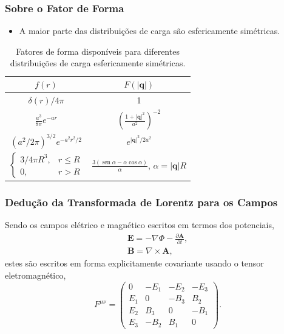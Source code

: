 \documentclass[xcolor=dvipsnames]{beamer}
\DeclareMathOperator*{\sen}{sen}
\renewcommand{\vec}{\mathbf}
\begin{document}
\begin{frame}
	\frametitle{Sobre o Fator de Forma}
	\begin{itemize}
		\item A maior parte das distribuições de carga são esfericamente
			simétricas.
	\end{itemize}
	\begin{table}
		\begin{tabular}{|c|c|}
			\hline 
			$f(r)$ & $F(|\vec{q}|)$ \\
			\hline
			 $\delta (r) / 4 \pi$ & 1 \\
			$\displaystyle \frac{a^3}{8\pi} e^{-ar}$ &
			$\displaystyle \left(\frac{1 + |\vec{q}|^2}{a^2}\right) ^{-2}$\\
			$ \left( a^2 / 2\pi \right)^{3/2} e
			^{-a^2 r^2 / 2}$ & $e^{|\vec{q}|^2 / 2a^2 }$ \\
			 $\displaystyle \begin{cases}
				3/4\pi R^3, & r \leq R \\
				0, & r > R
			\end{cases}$ & $ \displaystyle \frac{3(\sen \alpha - \alpha \cos
			\alpha)}{\alpha}$, $\alpha = |\vec{q}| R$ 
			\\
			\hline
		\end{tabular}
		\caption{Fatores de forma disponíveis para diferentes distribuições de
		carga esfericamente simétricas.}
	\end{table}
\end{frame}

\appendix

\begin{frame}
	\frametitle{Dedução da Transformada de Lorentz para os Campos}
	Sendo os campos elétrico e magnético escritos em termos dos potenciais,
	\begin{gather}
		\vec{E} = - \nabla \Phi - \frac{\partial \vec{A}}{\partial t}, \\
		\vec{B} = \nabla \times \vec{A},
	\end{gather}
	estes são escritos em forma explicitamente covariante usando o tensor
	eletromagnético,
	\begin{equation}
		F^{\mu \nu} = \begin{pmatrix}
			0 & -E_1 & -E_2 & -E_3 \\
			E_1 & 0 & -B_3 & B_2 \\
			E_2 & B_3 & 0 & -B_1 \\
			E_3 & -B_2 & B_1 & 0
		\end{pmatrix}.
	\end{equation}
\end{frame}
\end{document}
